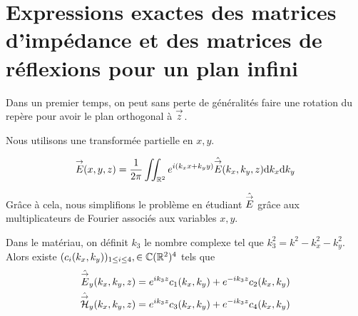 \section{Expressions exactes des matrices d'impédance et des matrices de réflexions pour un plan infini}

    Dans un premier temps, on peut sans perte de généralités faire une rotation du repère pour avoir le plan orthogonal à \(\vect{z}\).

    \begin{figure}[!h]
        \begin{center}
            \begin{tikzpicture}
                
            \end{tikzpicture}
        \end{center}
    \end{figure}

    Nous utilisons une transformée partielle en \(x, y\).

    \begin{equation}
        \vE(x,y,z) = \frac{1}{2\pi}\iint_{\RR^2} e^{i(k_x x + k_y y)}\hat{\vE} (k_x,k_y,z) \dd{k_x}\dd{k_y}
    \end{equation}

    Grâce à cela, nous simplifions le problème en étudiant \( \hat{\vE}\) grâce aux multiplicateurs de Fourier associés aux variables \(x,y\). 

    \begin{prop}
        Dans le matériau, on définit \(k_3\) le nombre complexe tel que \(k_3^2 = k^2 - k_x^2 - k_y^2\).
        Alors existe \((c_i(k_x,k_y))_{1\le i \le4}, \in \CC(\RR^2)^4\) tels que
        \begin{subequations}
            \begin{align}
                \hat{\vE}_y(k_x,k_y,z) & = e^{ik_3z}c_1(k_x,k_y) + e^{-ik_3z}c_2(k_x,k_y)
                \\
                \hat{\vH}_y(k_x,k_y,z) & = e^{ik_3z}c_3(k_x,k_y) + e^{-ik_3z}c_4(k_x,k_y)
            \end{align}
        \end{subequations}
    \end{prop}

